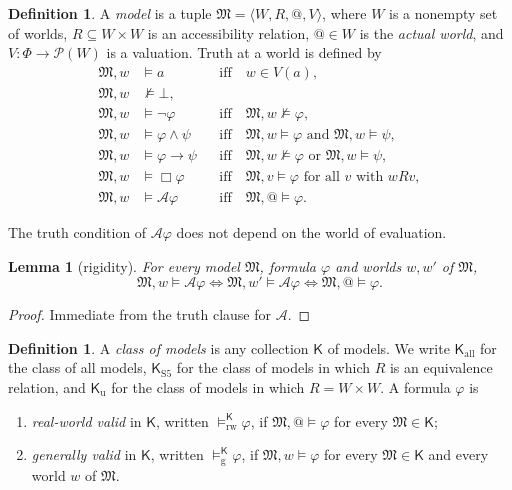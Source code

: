\documentclass[11pt]{amsart}
\makeatletter
\theoremstyle{plain}
\newtheorem{lemma}[theorem]{Lemma}
\theoremstyle{definition}
\newtheorem{definition}[theorem]{Definition}
\theoremstyle{remark}
\newcommand{\Act}{\mathcal{A}}
\newcommand{\Mod}{\mathfrak{M}}
\newcommand{\Kl}{\mathsf{K}}
\newcommand{\at}{@}
\newcommand{\RWv}[1]{\models^{#1}_{\mathrm{rw}}}
\newcommand{\Gv}[1]{\models^{#1}_{\mathrm{g}}}
\makeatother
\begin{document}
\begin{definition}
A \emph{model} is a tuple $\Mod = \langle W, R, \at, V\rangle$, where
$W$ is a nonempty set of worlds, $R \subseteq W \times W$ is an
accessibility relation, $\at \in W$ is the \emph{actual world}, and
$V\colon \Phi \to \mathcal{P}(W)$ is a valuation. Truth at a world is
defined by
\begin{align*}
  \Mod, w &\models a &&\text{iff}\quad w \in V(a),\\
  \Mod, w &\not\models \bot,\\
  \Mod, w &\models \neg\varphi &&\text{iff}\quad \Mod, w \not\models \varphi,\\
  \Mod, w &\models \varphi \wedge \psi &&\text{iff}\quad
     \Mod, w \models \varphi \text{ and } \Mod, w \models \psi,\\
  \Mod, w &\models \varphi \to \psi &&\text{iff}\quad
     \Mod, w \not\models \varphi \text{ or } \Mod, w \models \psi,\\
  \Mod, w &\models \Box\varphi &&\text{iff}\quad
     \Mod, v \models \varphi \text{ for all } v \text{ with } wRv,\\
  \Mod, w &\models \Act\varphi &&\text{iff}\quad \Mod, \at \models \varphi.
\end{align*}
\end{definition}

The truth condition of $\Act\varphi$ does not depend on the world of
evaluation.

\begin{lemma}[rigidity]
\label{lem:rigid}
For every model $\Mod$, formula $\varphi$ and worlds $w, w'$ of $\Mod$,
\[
  \Mod, w \models \Act\varphi
  \iff \Mod, w' \models \Act\varphi
  \iff \Mod, \at \models \varphi .
\]
\end{lemma}

\begin{proof}
Immediate from the truth clause for $\Act$.
\end{proof}

\begin{definition}
A \emph{class of models} is any collection $\Kl$ of models. We write
$\Kl_{\mathrm{all}}$ for the class of all models, $\Kl_{\mathrm{S5}}$
for the class of models in which $R$ is an equivalence relation, and
$\Kl_{\mathrm{u}}$ for the class of models in which $R = W \times W$.
A formula $\varphi$ is
\begin{enumerate}[label=(\roman*)]
\item \emph{real-world valid} in $\Kl$, written $\RWv{\Kl} \varphi$,
  if $\Mod, \at \models \varphi$ for every $\Mod \in \Kl$;
\item \emph{generally valid} in $\Kl$, written $\Gv{\Kl} \varphi$, if
  $\Mod, w \models \varphi$ for every $\Mod \in \Kl$ and every world
  $w$ of $\Mod$.
\end{enumerate}
\end{definition}
\end{document}
